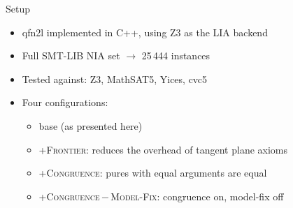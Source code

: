 \documentclass[11pt]{beamer}
\newcommand{\solver}{\textsf{qfn2l}}
\begin{document}
\begin{frame}{Setup}
	\begin{itemize}
		\item \alert{\solver} implemented in C++, using Z3 as the LIA backend
		\item Full SMT-LIB NIA set $\rightarrow$ 25\,444 instances
		\item Tested against: Z3, MathSAT5, Yices, cvc5
		\item Four configurations:
		      \begin{itemize}
			      \small
			      \item base (as presented here)
			      \item {+}\textsc{Frontier}: reduces the overhead of tangent plane axioms
			      \item {+}\textsc{Congruence}: pures with equal arguments are equal
			      \item {+}\textsc{Congruence}\,$-$\,\textsc{Model-Fix}: congruence on, model-fix off
		      \end{itemize}
	\end{itemize}
\end{frame}
\end{document}
